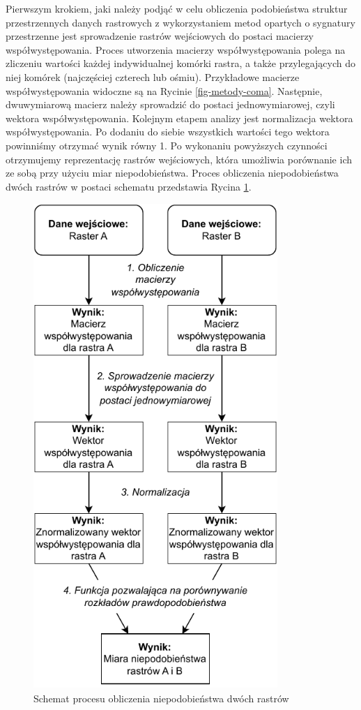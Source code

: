 \documentclass{amuthesis}
\begin{document}
Pierwszym krokiem, jaki należy podjąć w celu obliczenia podobieństwa
struktur przestrzennych danych rastrowych z wykorzystaniem metod
opartych o sygnatury przestrzenne jest sprowadzenie rastrów wejściowych
do postaci macierzy współwystępowania. Proces utworzenia macierzy
współwystępowania polega na zliczeniu wartości każdej indywidualnej
komórki rastra, a także przylegających do niej komórek (najczęściej
czterech lub ośmiu). Przykładowe macierze współwystępowania widoczne są
na Rycinie \ref{fig-metody-coma}. Następnie, dwuwymiarową macierz należy
sprowadzić do postaci jednowymiarowej, czyli wektora współwystępowania.
Kolejnym etapem analizy jest normalizacja wektora współwystępowania. Po
dodaniu do siebie wszystkich wartości tego wektora powinniśmy otrzymać
wynik równy 1. Po wykonaniu powyższych czynności otrzymujemy
reprezentację rastrów wejściowych, która umożliwia porównanie ich ze
sobą przy użyciu miar niepodobieństwa. Proces obliczenia niepodobieństwa
dwóch rastrów w postaci schematu przedstawia Rycina
\ref{fig-schemat-porownanie}.

\begin{figure}[t]

{\centering \includegraphics[width=3.64583in,height=7.23958in]{figures/diagram_raster_comparison.pdf}

}

\caption{\label{fig-schemat-porownanie}Schemat procesu obliczenia
niepodobieństwa dwóch rastrów}

\end{figure}
\end{document}
